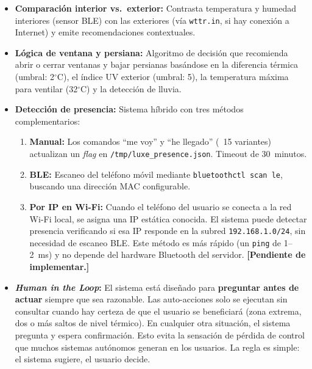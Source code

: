 \begin{itemize}
    \item \textbf{Comparación interior vs.\ exterior:} Contrasta temperatura y humedad interiores (sensor BLE) con las exteriores (vía \texttt{wttr.in}, si hay conexión a Internet) y emite recomendaciones contextuales.
    
    \item \textbf{Lógica de ventana y persiana:} Algoritmo de decisión que recomienda abrir o cerrar ventanas y bajar persianas basándose en la diferencia térmica (umbral: 2$^\circ$C), el índice UV exterior (umbral: 5), la temperatura máxima para ventilar (32$^\circ$C) y la detección de lluvia.
    
    \item \textbf{Detección de presencia:} Sistema híbrido con tres métodos complementarios:
    \begin{enumerate}
        \item \textbf{Manual:} Los comandos ``me voy'' y ``he llegado'' (~15 variantes) actualizan un \textit{flag} en \texttt{/tmp/luxe\_presence.json}. Timeout de 30~minutos.
        \item \textbf{BLE:} Escaneo del teléfono móvil mediante \texttt{bluetoothctl scan le}, buscando una dirección MAC configurable.
        \item \textbf{Por IP en Wi-Fi:} Cuando el teléfono del usuario se conecta a la red Wi-Fi local, se asigna una IP estática conocida. El sistema puede detectar presencia verificando si esa IP responde en la subred \texttt{192.168.1.0/24}, sin necesidad de escaneo BLE. Este método es más rápido (un \texttt{ping} de 1--2~ms) y no depende del hardware Bluetooth del servidor. \textbf{[Pendiente de implementar.]}
    \end{enumerate}
    
    \item \textbf{\textit{Human in the Loop}:} El sistema está diseñado para \textbf{preguntar antes de actuar} siempre que sea razonable. Las auto-acciones solo se ejecutan sin consultar cuando hay certeza de que el usuario se beneficiará (zona extrema, dos o más saltos de nivel térmico). En cualquier otra situación, el sistema pregunta y espera confirmación. Esto evita la sensación de pérdida de control que muchos sistemas autónomos generan en los usuarios. La regla es simple: el sistema sugiere, el usuario decide.
    

\end{itemize}
